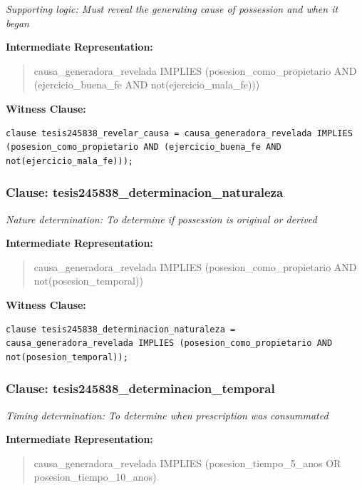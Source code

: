 \documentclass[11pt,a4paper]{article}
\begin{document}
\textit{Supporting logic: Must reveal the generating cause of possession and when it began}

\textbf{Intermediate Representation:}

\begin{quote}
causa\_generadora\_revelada IMPLIES (posesion\_como\_propietario AND (ejercicio\_buena\_fe AND not(ejercicio\_mala\_fe)))
\end{quote}

\textbf{Witness Clause:}

\begin{lstlisting}[style=witnessstyle, language=Witness]
clause tesis245838_revelar_causa = causa_generadora_revelada IMPLIES (posesion_como_propietario AND (ejercicio_buena_fe AND not(ejercicio_mala_fe)));
\end{lstlisting}

\subsubsection{Clause: tesis245838\_determinacion\_naturaleza}

\textit{Nature determination: To determine if possession is original or derived}

\textbf{Intermediate Representation:}

\begin{quote}
causa\_generadora\_revelada IMPLIES (posesion\_como\_propietario AND not(posesion\_temporal))
\end{quote}

\textbf{Witness Clause:}

\begin{lstlisting}[style=witnessstyle, language=Witness]
clause tesis245838_determinacion_naturaleza = causa_generadora_revelada IMPLIES (posesion_como_propietario AND not(posesion_temporal));
\end{lstlisting}

\subsubsection{Clause: tesis245838\_determinacion\_temporal}

\textit{Timing determination: To determine when prescription was consummated}

\textbf{Intermediate Representation:}

\begin{quote}
causa\_generadora\_revelada IMPLIES (posesion\_tiempo\_5\_anos OR posesion\_tiempo\_10\_anos)
\end{quote}
\end{document}
